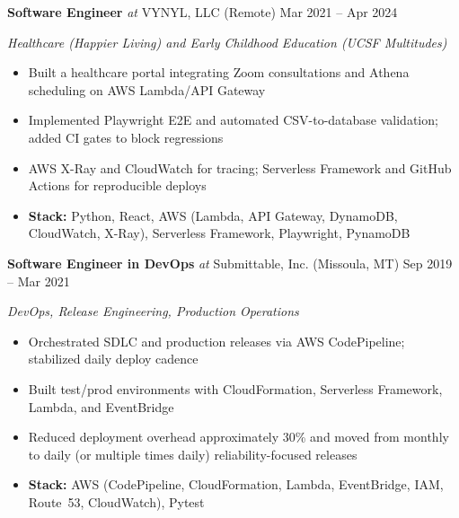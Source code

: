 \documentclass[10pt]{article}
\newcommand{\roleline}[4]{%
  \noindent\textbf{#1} \textit{at} #2 #3 \hfill #4\par
}
\begin{document}
\roleline{Software Engineer}{VYNYL, LLC}{(Remote)}{Mar 2021 -- Apr 2024}
\emph{Healthcare (Happier Living) and Early Childhood Education (UCSF Multitudes)}\par
\begin{itemize}
  \item Built a healthcare portal integrating Zoom consultations and Athena scheduling on AWS Lambda/API Gateway
  \item Implemented Playwright E2E and automated CSV-to-database validation; added CI gates to block regressions
  \item AWS X-Ray and CloudWatch for tracing; Serverless Framework and GitHub Actions for reproducible deploys
  \item \textbf{Stack:} Python, React, AWS (Lambda, API Gateway, DynamoDB, CloudWatch, X-Ray), Serverless Framework, Playwright, PynamoDB
\end{itemize}


\roleline{Software Engineer in DevOps}{Submittable, Inc.}{(Missoula, MT)}{Sep 2019 -- Mar 2021}
\emph{DevOps, Release Engineering, Production Operations}\par
\begin{itemize}
  \item Orchestrated SDLC and production releases via AWS CodePipeline; stabilized daily deploy cadence
  \item Built test/prod environments with CloudFormation, Serverless Framework, Lambda, and EventBridge
  \item Reduced deployment overhead approximately 30\% and moved from monthly to daily (or multiple times daily) reliability-focused releases
  \item \textbf{Stack:} AWS (CodePipeline, CloudFormation, Lambda, EventBridge, IAM, Route~53, CloudWatch), Pytest
\end{itemize}
\end{document}
